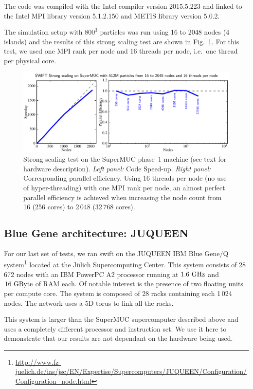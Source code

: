 \documentclass{sig-alternate-05-2015}
\newcommand{\swift}{{\sc swift}\xspace}
\begin{document}
The code was compiled with the Intel compiler version \textsc{2015.5.223} and
linked to the Intel MPI library version \textsc{5.1.2.150} and METIS library
version \textsc{5.0.2}.

The simulation setup with $800^3$ particles was run using 16 to
2048 nodes (4 islands) and the results of this strong scaling test are shown in
Fig.~\ref{fig:superMUC}. For this test, we used one MPI rank per node and 16
threads per node, i.e.~one thread per physical core.

\begin{figure}
\centering
\includegraphics[width=\textwidth]{Figures/scalingSuperMUC}
\caption{Strong scaling test on the SuperMUC phase~1 machine (see text
  for hardware description). \textit{Left panel:} Code
  Speed-up. \textit{Right panel:} Corresponding parallel efficiency.
  Using 16 threads per node (no use of hyper-threading) with one MPI rank
  per node, an almost perfect parallel efficiency is achieved when
  increasing the node count from 16 (256 cores) to 2\,048 (32\,768
  cores).
  \label{fig:superMUC}}
\end{figure}


\subsection{Blue Gene architecture: JUQUEEN}

For our last set of tests, we ran \swift on the JUQUEEN IBM Blue Gene/Q
system\footnote{\url{http://www.fz-juelich.de/ias/jsc/EN/Expertise/Supercomputers/JUQUEEN/Configuration/Configuration_node.html}}
located at the J\"ulich Supercomputing Center. This system consists of
28\,672 nodes with an IBM PowerPC A2 processor running at
$1.6~\rm{GHz}$ and $16~\rm{GByte}$ of RAM each. Of notable interest
is the presence of two floating units per compute core. The system is
composed of 28 racks containing each 1\,024 nodes. The network uses a
5D torus to link all the racks.

This system is larger than the SuperMUC supercomputer described above and
uses a completely different processor and instruction set.
We use it here to demonstrate that our results are not dependant
on the hardware being used.
\end{document}
